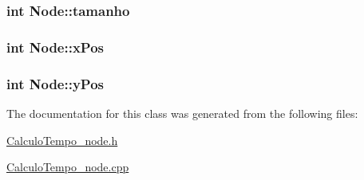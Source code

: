 \subsubsection[{\texorpdfstring{tamanho}{tamanho}}]{\setlength{\rightskip}{0pt plus 5cm}int Node\+::tamanho}\hypertarget{classNode_ab61bfe3b52ba63f10939bf88270321e0}{}\label{classNode_ab61bfe3b52ba63f10939bf88270321e0}
\subsubsection[{\texorpdfstring{x\+Pos}{xPos}}]{\setlength{\rightskip}{0pt plus 5cm}int Node\+::x\+Pos\hspace{0.3cm}{\ttfamily [private]}}\hypertarget{classNode_a4c5b1e397eba5f462edc72d5c031b33e}{}\label{classNode_a4c5b1e397eba5f462edc72d5c031b33e}
\subsubsection[{\texorpdfstring{y\+Pos}{yPos}}]{\setlength{\rightskip}{0pt plus 5cm}int Node\+::y\+Pos\hspace{0.3cm}{\ttfamily [private]}}\hypertarget{classNode_ace45ec1cc1cc78ef699918a7adeb1dad}{}\label{classNode_ace45ec1cc1cc78ef699918a7adeb1dad}


The documentation for this class was generated from the following files\+:\begin{DoxyCompactItemize}
\item 
\hyperlink{CalculoTempo__node_8h}{Calculo\+Tempo\+\_\+node.\+h}\item 
\hyperlink{CalculoTempo__node_8cpp}{Calculo\+Tempo\+\_\+node.\+cpp}\end{DoxyCompactItemize}
